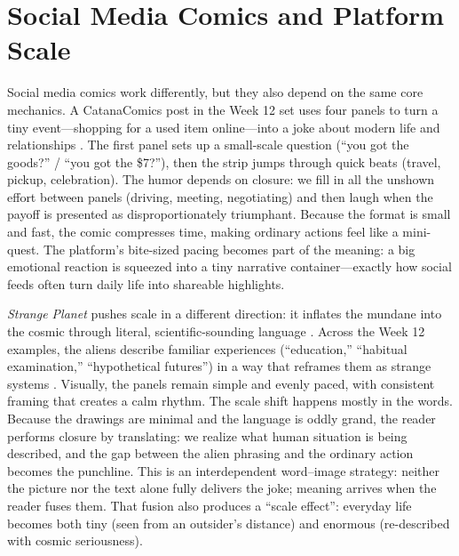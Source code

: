 \documentclass[conference]{IEEEtran}
\begin{document}
\section{Social Media Comics and Platform Scale}
Social media comics work differently, but they also depend on the same core mechanics. A CatanaComics post in the Week 12 set uses four panels to turn a tiny event---shopping for a used item online---into a joke about modern life and relationships \cite{CourseWeek12,CatanaComics}. The first panel sets up a small-scale question (``you got the goods?'' / ``you got the \$7?''), then the strip jumps through quick beats (travel, pickup, celebration). The humor depends on closure: we fill in all the unshown effort between panels (driving, meeting, negotiating) and then laugh when the payoff is presented as disproportionately triumphant. Because the format is small and fast, the comic compresses time, making ordinary actions feel like a mini-quest. The platform’s bite-sized pacing becomes part of the meaning: a big emotional reaction is squeezed into a tiny narrative container---exactly how social feeds often turn daily life into shareable highlights.


\textit{Strange Planet} pushes scale in a different direction: it inflates the mundane into the cosmic through literal, scientific-sounding language \cite{CourseWeek12,Pyle2019}. Across the Week 12 examples, the aliens describe familiar experiences (``education,'' ``habitual examination,'' ``hypothetical futures'') in a way that reframes them as strange systems \cite{CourseWeek12}. Visually, the panels remain simple and evenly paced, with consistent framing that creates a calm rhythm. The scale shift happens mostly in the words. Because the drawings are minimal and the language is oddly grand, the reader performs closure by translating: we realize what human situation is being described, and the gap between the alien phrasing and the ordinary action becomes the punchline. This is an interdependent word--image strategy: neither the picture nor the text alone fully delivers the joke; meaning arrives when the reader fuses them. That fusion also produces a ``scale effect'': everyday life becomes both tiny (seen from an outsider’s distance) and enormous (re-described with cosmic seriousness).
\end{document}
